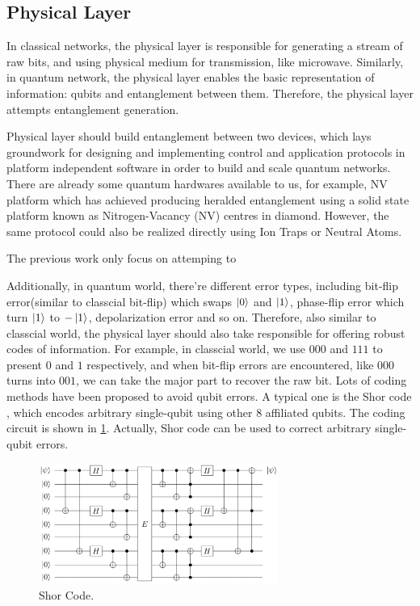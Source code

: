 \documentclass[10pt]{article}
\begin{document}
\subsection{Physical Layer}

In classical networks, the physical layer is responsible for generating a stream of raw bits, and using physical medium for transmission, like microwave. Similarly, in quantum network, the physical layer enables the basic representation of information: qubits and entanglement between them. Therefore, the physical layer attempts entanglement generation. 

Physical layer should build entanglement between two devices, which lays groundwork for designing and implementing control and application protocols in platform independent software in order to build and scale quantum networks. There are already some quantum hardwares available to us, for example, NV platform which has achieved producing heralded entanglement using a solid state platform known as Nitrogen-Vacancy (NV) centres in diamond\cite{hensen2015loophole}. 
However, the same protocol could also be realized directly using Ion Traps\cite{moehring2007entanglement}
or Neutral Atoms\cite{hofmann2012heralded}.

The previous work only focus on attemping to 

Additionally, in quantum world, there're different error types, including bit-flip error(similar to classcial bit-flip) which swaps $\ket{0}$ and $\ket{1}$, phase-flip error which turn $\ket{1}$ to $-\ket{1}$, depolarization error and so on. Therefore, also similar to classcial world, the physical layer should also take responsible for offering robust codes of information. For example, in classcial world, we use $000$ and $111$ to present $0$ and $1$ respectively, and when bit-flip errors are encountered, like $000$ turns into $001$, we can take the major part to recover the raw bit. 
Lots of coding methods have been proposed to avoid qubit errors. A typical one is the Shor code \cite{shor1995scheme}, which encodes arbitrary single-qubit using other 8 affiliated qubits. The coding circuit is shown in \ref{shor code}. Actually, Shor code can be used to correct arbitrary single-qubit errors.
\begin{figure}[htbp]
    \centering
    \includegraphics[width=0.7\textwidth]{figure/shor_code.jpg}
    \caption{Shor Code.}
    \label{shor code}
\end{figure}
\end{document}
